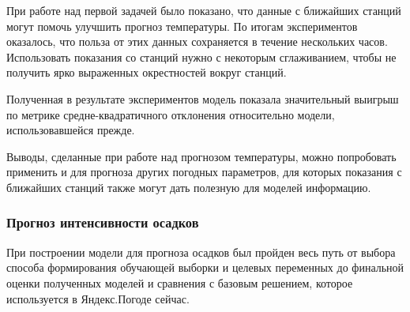 \documentclass[14pt]{matmex-diploma}
\begin{document}
При работе над первой задачей было показано, что данные с ближайших станций могут помочь улучшить прогноз температуры. По итогам экспериментов оказалось, что польза от этих данных сохраняется в течение нескольких часов. Использовать показания со станций нужно с некоторым сглаживанием, чтобы не получить ярко выраженных окрестностей вокруг станций. 

Полученная в результате экспериментов модель показала значительный выигрыш по метрике средне-квадратичного отклонения относительно модели, использовавшейся прежде. %

Выводы, сделанные при работе над прогнозом температуры, можно попробовать применить и для прогноза других погодных параметров, для которых показания с ближайших станций также могут дать полезную для моделей информацию.







\subsubsection*{Прогноз интенсивности осадков}

При построении модели для прогноза осадков был пройден весь путь от выбора способа формирования обучающей выборки и целевых переменных до финальной оценки полученных моделей и сравнения с базовым решением, которое используется в Яндекс.Погоде сейчас.
\end{document}
